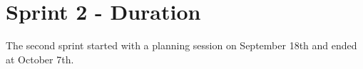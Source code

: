 \section{Sprint 2 - Duration}
The second sprint started with a planning session on September 18th and ended at October 7th. 


